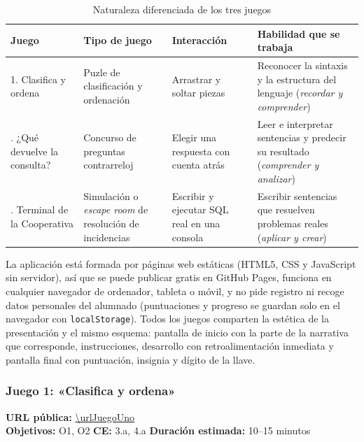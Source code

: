 \documentclass[11pt,a4paper]{article}
\begin{document}
\begin{table}[H]
\centering\small
\begin{tabularx}{\linewidth}{@{}l>{\raggedright}p{2.7cm}>{\raggedright}p{3.2cm}>{\raggedright\arraybackslash}X@{}}
\toprule
\textbf{Juego} & \textbf{Tipo de juego} & \textbf{Interacción} & \textbf{Habilidad que se trabaja} \\
\midrule
1. Clasifica y ordena & Puzle de clasificación y ordenación & Arrastrar y soltar piezas &
Reconocer la sintaxis y la estructura del lenguaje (\emph{recordar y comprender}) \\
\addlinespace
2. ¿Qué devuelve la consulta? & Concurso de preguntas contrarreloj & Elegir una respuesta con
cuenta atrás & Leer e interpretar sentencias y predecir su resultado (\emph{comprender y
analizar}) \\
\addlinespace
3. Terminal de la Cooperativa & Simulación o \emph{escape room} de resolución de
incidencias & Escribir y ejecutar SQL real en una consola & Escribir sentencias que
resuelven problemas reales (\emph{aplicar y crear}) \\
\bottomrule
\end{tabularx}
\caption{Naturaleza diferenciada de los tres juegos}
\end{table}

La aplicación está formada por páginas web estáticas (HTML5, CSS y JavaScript sin servidor),
así que se puede publicar gratis en GitHub Pages, funciona en cualquier navegador de
ordenador, tableta o móvil, y no pide registro ni recoge datos personales del alumnado (puntuaciones y
progreso se guardan solo en el navegador con \texttt{localStorage}). Todos los juegos
comparten la estética de la presentación y el mismo esquema:
pantalla de inicio con la parte de la narrativa que corresponde, instrucciones, desarrollo
con retroalimentación inmediata y pantalla final con puntuación, insignia y dígito de la llave.

\subsubsection{Juego 1: «Clasifica y ordena»}

\begin{nota}
\textbf{URL pública:} \url{\urlJuegoUno}\\
\textbf{Objetivos:} O1, O2 \quad \textbf{CE:} 3.a, 4.a \quad
\textbf{Duración estimada:} 10–15 minutos
\end{nota}
\end{document}

